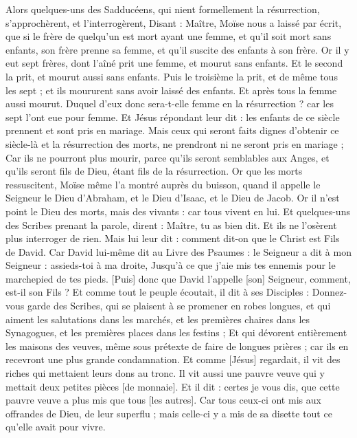 \begin{multicols}{2}
Alors quelques-uns des Sadducéens, qui nient formellement la résurrection, s'approchèrent, et l'interrogèrent,
Disant : Maître, Moïse nous a laissé par écrit, que si le frère de quelqu'un est mort ayant une femme, et qu'il soit mort sans enfants, son frère prenne sa femme, et qu'il suscite des enfants à son frère.
Or il y eut sept frères, dont l'aîné prit une femme, et mourut sans enfants.
Et le second la prit, et mourut aussi sans enfants.
Puis le troisième la prit, et de même tous les sept ; et ils moururent sans avoir laissé des enfants.
Et après tous la femme aussi mourut.
Duquel d'eux donc sera-t-elle femme en la résurrection ? car les sept l'ont eue pour femme.
Et Jésus répondant leur dit : les enfants de ce siècle prennent et sont pris en mariage.
Mais ceux qui seront faits dignes d'obtenir ce siècle-là et la résurrection des morts, ne prendront ni ne seront pris en mariage ;
Car ils ne pourront plus mourir, parce qu'ils seront semblables aux Anges, et qu'ils seront fils de Dieu, étant fils de la résurrection.
Or que les morts ressuscitent, Moïse même l'a montré auprès du buisson, quand il appelle le Seigneur le Dieu d'Abraham, et le Dieu d'Isaac, et le Dieu de Jacob.
Or il n'est point le Dieu des morts, mais des vivants : car tous vivent en lui.
Et quelques-uns des Scribes prenant la parole, dirent : Maître, tu as bien dit.
Et ils ne l'osèrent plus interroger de rien.
Mais lui leur dit : comment dit-on que le Christ est Fils de David.
Car David lui-même dit au Livre des Psaumes : le Seigneur a dit à mon Seigneur : assieds-toi à ma droite,
Jusqu'à ce que j'aie mis tes ennemis pour le marchepied de tes pieds.
[Puis] donc que David l'appelle [son] Seigneur, comment, est-il son Fils ?
Et comme tout le peuple écoutait, il dit à ses Disciples :
Donnez-vous garde des Scribes, qui se plaisent à se promener en robes longues, et qui aiment les salutations dans les marchés, et les premières chaires dans les Synagogues, et les premières places dans les festins ;
Et qui dévorent entièrement les maisons des veuves, même sous prétexte de faire de longues prières ; car ils en recevront une plus grande condamnation.
\VerseOne{}Et comme [Jésus] regardait, il vit des riches qui mettaient leurs dons au tronc.
Il vit aussi une pauvre veuve qui y mettait deux petites pièces [de monnaie].
Et il dit : certes je vous dis, que cette pauvre veuve a plus mis que tous [les autres].
Car tous ceux-ci ont mis aux offrandes de Dieu, de leur superflu ; mais celle-ci y a mis de sa disette tout ce qu'elle avait pour vivre.

\end{multicols}
